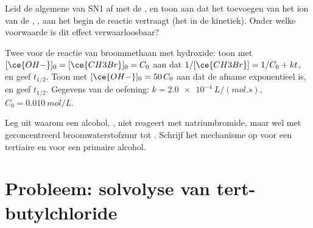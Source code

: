 \begin{exercise}[$\star\star\star$]\label{exo:b1:nucleophilic-substitution:10}
Leid de algemene  van SN1 af met de
, en toon aan dat het toevoegen van het
ion van de , , aan het begin de reactie
vertraagt (het  in de kinetiek).
Onder welke voorwaarde is dit effect verwaarloosbaar?
\end{exercise}

\begin{exercise}[$\star\star\star$]\label{exo:b1:nucleophilic-substitution:11}
Twee  voor de reactie van broommethaan met hydroxide: toon
met $[\ce{OH-}]_0 = [\ce{CH3Br}]_0 = C_0$ aan dat $1/[\ce{CH3Br}] = 1/C_0 +
kt$, en geef $t_{1/2}$. Toon met $[\ce{OH-}]_0 = 50\,C_0$ aan dat de
afname exponentieel is, en geef $t_{1/2}$. Gegevens van de oefening: $k =
\qty{2.0e-4}{L/(mol.s)}$, $C_0 = \qty{0.010}{mol/L}$.
\end{exercise}

\begin{exercise}[$\star\star\star$]\label{exo:b1:nucleophilic-substitution:12}
Leg uit waarom een alcohol, , niet reageert met natriumbromide,
maar wel met geconcentreerd broomwaterstofzuur tot . Schrijf het
mechanisme op voor een tertiaire en voor een primaire alcohol.
\end{exercise}

\section{Probleem: solvolyse van tert-butylchloride}

